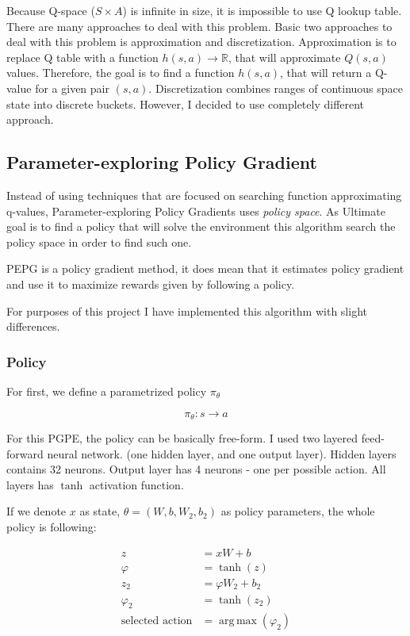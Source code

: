 \documentclass[12pt]{article}
\DeclareMathOperator*{\argmax}{arg\,max}
\begin{document}
Because Q-space ($S \times A$) is infinite in size, it is impossible to use Q lookup table. There are many approaches to deal with this problem. Basic two approaches to deal with this problem is approximation and discretization. Approximation is to replace Q table with a function $h(s,a) \rightarrow \mathbb{R}$, that will approximate $Q(s, a)$ values. Therefore, the goal is to find a function $h(s, a)$, that will return a Q-value for a given pair $(s,a)$. 
Discretization combines ranges of continuous space state into discrete buckets. However, I decided to use completely different approach.

\subsection{Parameter-exploring Policy Gradient}
Instead of using techniques that are focused on searching function approximating q-values, Parameter-exploring Policy Gradients\cite{pgpe} uses \emph{policy space}. As Ultimate goal is to find a policy that will solve the environment this algorithm search the policy space in order to find such one.

PEPG is a policy gradient method, it does mean that it estimates policy gradient and use it to maximize rewards given by following a policy.

For purposes of this project I have implemented this algorithm with slight differences.

\subsubsection{Policy}

For first, we define a parametrized policy $\pi_\theta$

\begin{equation}
\pi_\theta: s \rightarrow a
\end{equation}

For this PGPE, the policy can be basically free-form. I used two layered feed-forward neural network. (one hidden layer, and one output layer).
Hidden layers contains 32 neurons. Output layer has 4 neurons - one per possible action. All layers has $\tanh$ activation function.

If we denote $x$ as state, $\theta = (W,b,W_2,b_2)$ as policy parameters, the whole policy is following:

\begin{equation}
\begin{aligned}
z &= xW + b \\
\varphi &= \tanh(z) \\
z_2 &= \varphi W_2 + b_2 \\
\varphi_2 &= \tanh(z_2) \\
\text{selected action} &= \argmax(\varphi_2)
\end{aligned}
\end{equation}
\end{document}

